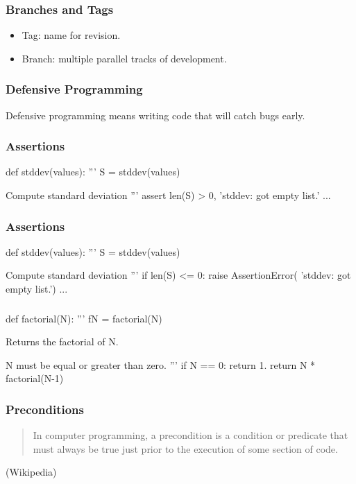 \begin{frame}[fragile]
\frametitle{Branches and Tags}
\begin{itemize}
\item Tag: name for revision.
\item Branch: multiple parallel tracks of development.
\end{itemize}

\end{frame}

\begin{frame}[fragile]
\frametitle{Defensive Programming}

Defensive programming means writing code that will catch bugs early.
\end{frame}

\begin{frame}[fragile]
\frametitle{Assertions}
\begin{python}
def stddev(values):
    '''
    S = stddev(values)

    Compute standard deviation
    '''
    assert len(S) > 0, 'stddev: got empty list.'
    ...
\end{python}
\end{frame}

\begin{frame}[fragile]
\frametitle{Assertions}

\begin{python}
def stddev(values):
    '''
    S = stddev(values)

    Compute standard deviation
    '''
    if len(S) <= 0:
        raise AssertionError(
            'stddev: got empty list.')
    ...
\end{python}

\end{frame}

\begin{frame}[fragile]
\frametitle{}

\begin{python}
def factorial(N):
    '''
    fN = factorial(N)

    Returns the factorial of N.

    N must be equal or greater than zero.
    '''
    if N == 0:
        return 1.
    return N * factorial(N-1)
\end{python}
\end{frame}

\begin{frame}[fragile]
\frametitle{Preconditions}

\begin{quote}
In computer programming, a precondition is a condition or predicate that must always be true just prior to the execution of some section of code.
\end{quote}

\begin{flushright}
(Wikipedia)
\end{flushright}

\end{frame}

